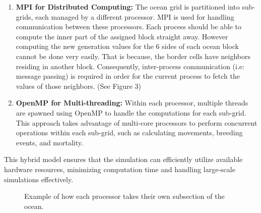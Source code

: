 \documentclass[conference,compsoc]{IEEEtran}
\begin{document}
\begin{enumerate}
\item \textbf{MPI for Distributed Computing:} The ocean grid is partitioned into sub-grids, each managed by a different processor. MPI is used for handling communication between these processors.  Each process should be able to compute the inner part of the assigned block straight away. However computing the new generation values for the 6 sides of each ocean block cannot be done very easily. That is because, the border cells have neighbors residing in another block. Consequently, inter-process communication (i.e: message passing) is required in order for the current process to fetch the values of those neighbors. (See Figure 3)

\item \textbf{OpenMP for Multi-threading:} Within each processor, multiple threads are spawned using OpenMP to handle the computations for each sub-grid. This approach takes advantage of multi-core processors to perform concurrent operations within each sub-grid, such as calculating movements, breeding events, and mortality.
\end{enumerate}

This hybrid model ensures that the simulation can efficiently utilize available hardware resources, minimizing computation time and handling large-scale simulations effectively.

\begin{figure}[!t]
\centering
{}
\caption{Example of how each processor takes their own subsection of the ocean.}
\label{fig_sim}
\end{figure}


\end{document}
